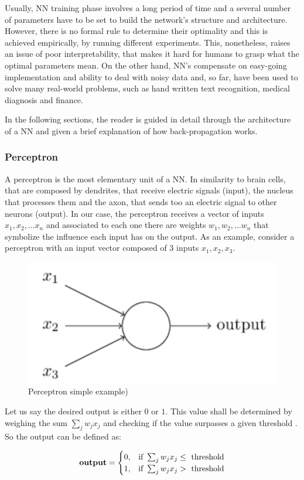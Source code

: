 Usually, NN training phase involves a long period of time and a several number of parameters have to be set to build the network's structure and architecture. However, there is no formal rule to determine their optimality and this is achieved empirically, by running different experiments. This, nonetheless, raises an issue of poor interpretability, that makes it hard for humans to grasp what the optimal parameters mean. 
On the other hand, NN's compensate on easy-going implementation and ability to deal with noisy data and, so far, have been used to solve many real-world problems, such as hand written text recognition, medical diagnosis and finance. \cite{HanDataMining}

In the following sections, the reader is guided in detail through the architecture of a NN and given a brief explanation of how back-propagation works.

\subsubsection{Perceptron}

A perceptron is the most elementary unit of a NN. In similarity to brain cells, that are composed by dendrites, that receive electric signals (input), the nucleus that processes them and the axon, that sends too an electric signal to other neurons (output). In our case, the perceptron receives a vector of inputs ${x_1, x_2,... x_n}$ and associated to each one there are weights ${w_1,w_2,...w_n}$ that symbolize the influence each input has on the output. As an example, consider a perceptron with an input vector composed of 3 inputs ${x_1, x_2, x_3}$.

\begin{figure}[H]
	\centering
	\includegraphics[scale=0.5, width=0.35\linewidth]{figures/perceptron.png}
	\caption{Perceptron simple example)}
	\label{perceptron}
\end{figure} 

 Let us say the desired output is either $0$ or $1$. This value shall be determined by weighing the sum $ \sum_j w_j x_j$ and checking if the value surpasses a given threshold \cite{nielsenneural}. So the output can be defined as: 

\begin{equation}
\mbox{\textbf{output}} = \begin{cases} 0, & \mbox{if } \sum_j w_j x_j \le \mbox{ threshold} \\ 1, & \mbox{if } \sum_j w_j x_j > \mbox{ threshold} \end{cases}
\end{equation}

